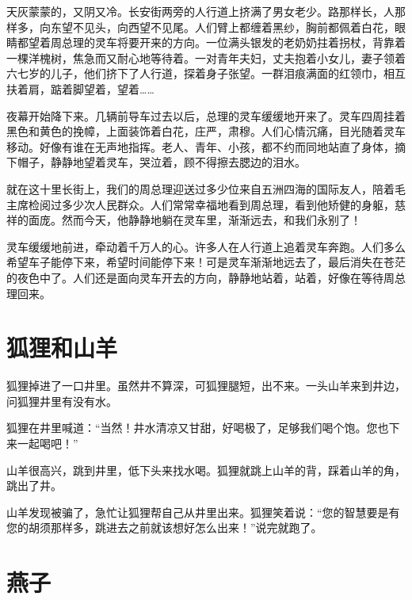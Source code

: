 \documentclass[12pt,UTF-8,openany]{ctexbook}
\begin{document}
\begin{large}
    
    天灰蒙蒙的，又阴又冷。长安街两旁的人行道上挤满了男女老少。路那样长，人那样多，向东望不见头，向西望不见尾。人们臂上都缠着黑纱，胸前都佩着白花，眼睛都望着周总理的灵车将要开来的方向。一位满头银发的老奶奶拄着拐杖，背靠着一棵洋槐树，焦急而又耐心地等待着。一对青年夫妇，丈夫抱着小女儿，妻子领着六七岁的儿子，他们挤下了人行道，探着身子张望。一群泪痕满面的红领巾，相互扶着肩，踮着脚望着，望着……
    
    夜幕开始降下来。几辆前导车过去以后，总理的灵车缓缓地开来了。灵车四周挂着黑色和黄色的挽幛，上面装饰着白花，庄严，肃穆。人们心情沉痛，目光随着灵车移动。好像有谁在无声地指挥。老人、青年、小孩，都不约而同地站直了身体，摘下帽子，静静地望着灵车，哭泣着，顾不得擦去腮边的泪水。
    
    就在这十里长街上，我们的周总理迎送过多少位来自五洲四海的国际友人，陪着毛主席检阅过多少次人民群众。人们常常幸福地看到周总理，看到他矫健的身躯，慈祥的面庞。然而今天，他静静地躺在灵车里，渐渐远去，和我们永别了！
    
    灵车缓缓地前进，牵动着千万人的心。许多人在人行道上追着灵车奔跑。人们多么希望车子能停下来，希望时间能停下来！可是灵车渐渐地远去了，最后消失在苍茫的夜色中了。人们还是面向灵车开去的方向，静静地站着，站着，好像在等待周总理回来。
    
\end{large}



\chapter{狐狸和山羊}

\begin{large}
    
    狐狸掉进了一口井里。虽然井不算深，可狐狸腿短，出不来。一头山羊来到井边，问狐狸井里有没有水。
    
    狐狸在井里喊道：“当然！井水清凉又甘甜，好喝极了，足够我们喝个饱。您也下来一起喝吧！”
    
    山羊很高兴，跳到井里，低下头来找水喝。狐狸就跳上山羊的背，踩着山羊的角，跳出了井。
    
    山羊发现被骗了，急忙让狐狸帮自己从井里出来。狐狸笑着说：“您的智慧要是有您的胡须那样多，跳进去之前就该想好怎么出来！”说完就跑了。
    
\end{large}



\chapter{燕子}
\end{document}
